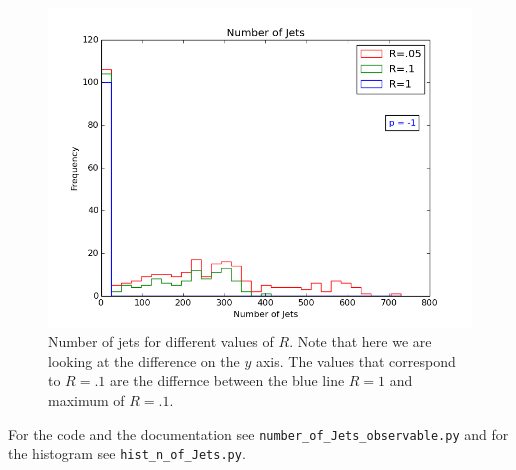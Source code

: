 \begin{figure}[hbtp]
 \centering
 \includegraphics[scale=.6]{images/n_of_jets_obs.png}
 \caption{Number of jets for different values of $R$. Note that here we are looking at the difference on the $y$ axis. The values that correspond to $R = .1$ are the differnce between the blue line $R = 1$ and maximum of $R = .1$.  }\label{nofjet}
 \end{figure}
  
For the code and the documentation see \verb+number_of_Jets_observable.py+ and for the histogram see \verb+hist_n_of_Jets.py+.   
